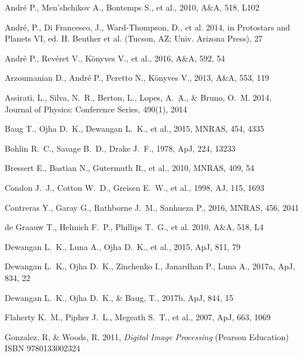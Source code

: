 \documentclass[iop]{emulateapj}
\begin{document}
\begin{thebibliography}{}
%
Andr{\'e} P., Men'shchikov A., Bontemps S., et al., 2010, A\&A, 518, L102

Andr{\'e}, P., Di Francesco, J., Ward-Thompson, D., et al. 2014, in Protostars and Planets VI, ed. H. Beuther et al. (Tucson, AZ; Univ. Arizona Press), 27

Andr{\'e} P., Rev{\'e}ret V., K\"{o}nyves V., et al., 2016, A\&A, 592, 54

Arzoumanian D., Andr{\'e} P., Peretto N., K\"{o}nyves V., 2013, A\&A, 553, 119

Assirati, L., Silva, N.~R., Berton, L., Lopes, A.~A., \& Bruno, O.~M. 2014, Journal of Physics: Conference Series, 490(1), 2014

Baug T., Ojha D.~K., Dewangan L.~K., et al., 2015, MNRAS, 454, 4335

Bohlin R.~C., Savage B.~D., Drake J.~F., 1978, ApJ, 224, 13233

Bressert E., Bastian N., Gutermuth R., et al., 2010, MNRAS, 409, 54

Condon J.~J., Cotton W.~D., Greisen E.~W., et al., 1998, AJ, 115, 1693

Contreras Y., Garay G., Rathborne J.~M., Sanhueza P., 2016, MNRAS, 456, 2041

de Graauw T., Helmich F.~P., Phillips T.~G., et al. 2010, A\&A, 518, L4

Dewangan L.~K., Luna A., Ojha D.~K., et al., 2015, ApJ, 811, 79

Dewangan L.~K., Ojha D.~K., Zinchenko I., Janardhan P., Luna A.,  2017a, ApJ, 834, 22

Dewangan L.~K., Ojha D.~K., \& Baug, T.,  2017b, ApJ, 844, 15

Flaherty K.~M., Pipher J.~L., Megeath S.~T., et al., 2007, ApJ, 663, 1069

Gonzalez, R, \& Woods, R. 2011, {\it Digital Image Processing} (Pearson Education) ISBN 9780133002324


\end{thebibliography}
\end{document}

